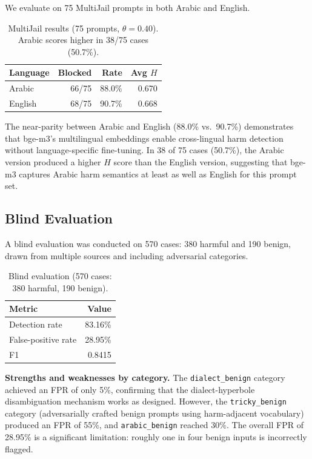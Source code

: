 \documentclass[11pt]{article}
\begin{document}
We evaluate on 75 MultiJail prompts in both Arabic and English.

\begin{table}[h]
\centering
\small
\begin{tabular}{@{}lrrr@{}}
\toprule
\textbf{Language} & \textbf{Blocked} & \textbf{Rate} & \textbf{Avg $H$} \\
\midrule
Arabic & 66/75 & 88.0\% & 0.670 \\
English & 68/75 & 90.7\% & 0.668 \\
\bottomrule
\end{tabular}
\caption{MultiJail results (75 prompts, $\theta{=}0.40$). Arabic scores higher in 38/75 cases (50.7\%).}
\label{tab:multijail}
\end{table}

The near-parity between Arabic and English (88.0\% vs.\ 90.7\%) demonstrates that bge-m3's multilingual embeddings enable cross-lingual harm detection without language-specific fine-tuning.
In 38 of 75 cases (50.7\%), the Arabic version produced a higher $H$ score than the English version, suggesting that bge-m3 captures Arabic harm semantics at least as well as English for this prompt set.

\subsection{Blind Evaluation}
\label{sec:blind}

A blind evaluation was conducted on 570 cases: 380 harmful and 190 benign, drawn from multiple sources and including adversarial categories.

\begin{table}[h]
\centering
\small
\begin{tabular}{@{}lr@{}}
\toprule
\textbf{Metric} & \textbf{Value} \\
\midrule
Detection rate & 83.16\% \\
False-positive rate & 28.95\% \\
F1 & 0.8415 \\
\bottomrule
\end{tabular}
\caption{Blind evaluation (570 cases: 380 harmful, 190 benign).}
\label{tab:blind}
\end{table}

\textbf{Strengths and weaknesses by category.}
The \texttt{dialect\_benign} category achieved an FPR of only 5\%, confirming that the dialect-hyperbole disambiguation mechanism works as designed.
However, the \texttt{tricky\_benign} category (adversarially crafted benign prompts using harm-adjacent vocabulary) produced an FPR of 55\%, and \texttt{arabic\_benign} reached 30\%.
The overall FPR of 28.95\% is a significant limitation: roughly one in four benign inputs is incorrectly flagged.
\end{document}
